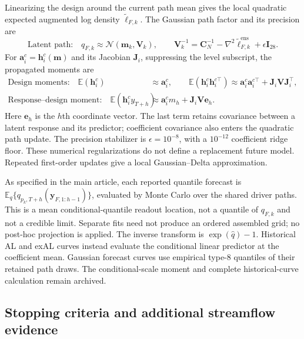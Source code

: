 \documentclass[12pt,letterpaper]{article}
\newcommand{\E}{\mathbb{E}}
\newcommand{\vect}[1]{\bm{#1}}
\newcommand{\mat}[1]{\bm{#1}}
\newcommand{\Normal}{\mathcal{N}}
\numberwithin{suppalgorithm}{section}
\numberwithin{equation}{section}
\numberwithin{table}{section}
\numberwithin{figure}{section}
\begin{document}
Linearizing the design around the current path mean gives the local
quadratic expected augmented log density \(\widetilde\ell_{F,k}\).
The Gaussian path factor and its precision are
\begin{equation}
\text{Latent path:}\quad
q_{F,k}\approx\Normal(\vect m_k,\mat V_k),\qquad
\mat V_k^{-1}=\mat C_N^{-1}
-\nabla^2\widetilde\ell_{F,k}^{\mathrm{ens}}+\epsilon\mat I_{28}.
\label{eq:supp_glofas_future_path_factor}
\end{equation}
For \(\vect a_i^c=\vect h_i^c(\vect m)\) and its Jacobian
\(\mat J_i\), suppressing the level subscript, the propagated moments are
\begin{equation}
\begin{aligned}
\text{Design moments:}\quad
\E(\vect h_i^c)&\approx\vect a_i^c,\qquad
\E(\vect h_i^c\vect h_i^{c\top})
\approx\vect a_i^c\vect a_i^{c\top}+\mat J_i\mat V\mat J_i^\top,\\
\text{Response--design moment:}\quad
\E(\vect h_i^c y_{T+h})&\approx\vect a_i^c m_h+\mat J_i\mat V\vect e_h.
\end{aligned}
\label{eq:supp_glofas_future_path_delta}
\end{equation}
Here \(\vect e_h\) is the \(h\)th coordinate vector. The last term
retains covariance between a latent response and its predictor; coefficient
covariance also enters the quadratic path update. The precision stabilizer
is \(\epsilon=10^{-8}\), with a \(10^{-12}\) coefficient ridge floor.
These numerical regularizations do not define a replacement future model.
Repeated first-order updates give a local Gaussian--Delta approximation.

As specified in the main article, each reported quantile forecast is
\(\E_q\{q_{p_k,T+h}(\vect y_{F,1:h-1})\}\), evaluated by Monte Carlo
over the shared driver paths. This is a mean conditional-quantile readout
location, not a quantile of \(q_{F,k}\) and not a credible limit. Separate
fits need not produce an ordered assembled grid; no post-hoc projection is
applied. The inverse transform is \(\exp(\widehat q)-1\). Historical AL and
exAL curves instead evaluate the conditional linear predictor at the
coefficient mean. Gaussian forecast curves use empirical type-8 quantiles
of their retained path draws. The conditional-scale moment and complete
historical-curve calculation remain archived.

\subsection{Stopping criteria and additional streamflow evidence}
\label{subsec:glofas_checks}
\end{document}
